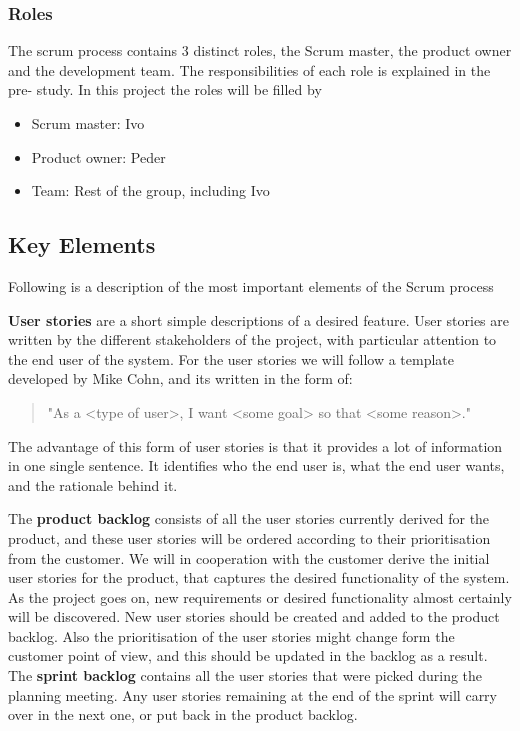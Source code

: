 \subsubsection{Roles}
The scrum process contains 3 distinct roles, the Scrum master, the product owner and the development team. The responsibilities of each role is explained in the pre- study. In this project the roles will be filled by
\begin{itemize}
\item Scrum master: Ivo
\item Product owner: Peder
\item Team: Rest of the group, including Ivo
\end{itemize}

\subsection{Key Elements}
Following is a description of the most important elements of the Scrum process

{\bf User stories} are a short simple descriptions of a desired feature. User stories are written by the different stakeholders of the project, with particular attention to the end user of the system. For the user stories we will follow a template developed by Mike Cohn, and its written in the form of: \begin{quote} "As a <type of user>, I want <some goal> so that <some reason>." \end{quote} The advantage of this form of user stories is that it provides a lot of information in one single sentence. It identifies who the end user is, what the end user wants, and the rationale behind it. 

The {\bf product backlog} consists of all the user stories currently derived for the product, and these user stories will be ordered according to their prioritisation from the customer. We will in cooperation with the customer derive the initial user stories for the product, that captures the desired functionality of the system. As the project goes on, new requirements or desired functionality almost certainly will be discovered. New user stories should be created and added to the product backlog. Also the prioritisation of the user stories might change form the customer point of view, and this should be updated in the backlog as a result. The {\bf sprint backlog} contains all the user stories that were picked during the planning meeting. Any user stories remaining at the end of the sprint will carry over in the next one, or put back in the product backlog.

